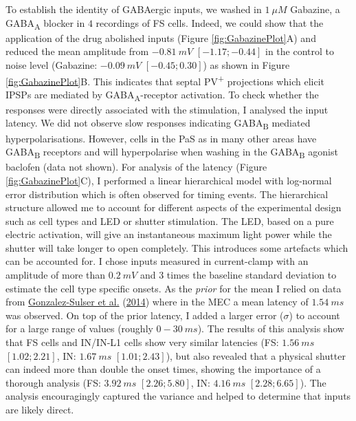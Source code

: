\documentclass[
  12pt,
  a4paper,
  openany]{book}
\begin{document}
\noindent To establish the identity of GABAergic inputs, we washed in \(1\ \mu M\) Gabazine, a GABA\textsubscript{A} blocker in \(4\) recordings of FS cells. Indeed, we could show that the application of the drug abolished inputs (Figure \ref{fig:GabazinePlot}A) and reduced the mean amplitude from \(-0.81\)\(\ mV\) \([-1.17; -0.44]\) in the control to noise level (Gabazine: \(-0.09\ mV\) \([-0.45; 0.30]\)) as shown in Figure \ref{fig:GabazinePlot}B. This indicates that septal PV\textsuperscript{+} projections which elicit IPSPs are mediated by GABA\textsubscript{A}-receptor activation. To check whether the responses were directly associated with the stimulation, I analysed the input latency. We did not observe slow responses indicating GABA\textsubscript{B} mediated hyperpolarisations. However, cells in the PaS as in many other areas have GABA\textsubscript{B} receptors and will hyperpolarise when washing in the GABA\textsubscript{B} agonist baclofen (data not shown). For analysis of the latency (Figure \ref{fig:GabazinePlot}C), I performed a linear hierarchical model with log-normal error distribution which is often observed for timing events. The hierarchical structure allowed me to account for different aspects of the experimental design such as cell types and LED or shutter stimulation. The LED, based on a pure electric activation, will give an instantaneous maximum light power while the shutter will take longer to open completely. This introduces some artefacts which can be accounted for. I chose inputs measured in current-clamp with an amplitude of more than \(0.2\ mV\) and \(3\) times the baseline standard deviation to estimate the cell type specific onsets. As the \emph{prior} for the mean I relied on data from \protect\hyperlink{ref-gonzalez-sulser_gabaergic_2014}{Gonzalez-Sulser et al.} (\protect\hyperlink{ref-gonzalez-sulser_gabaergic_2014}{2014}) where in the MEC a mean latency of \(1.54\ ms\) was observed. On top of the prior latency, I added a larger error (\(\sigma\)) to account for a large range of values (roughly \(0-30\ ms\)). The results of this analysis show that FS cells and IN/IN-L1 cells show very similar latencies (FS: \(1.56\ ms\) \([1.02; 2.21]\), IN: \(1.67\ ms\) \([1.01; 2.43]\)), but also revealed that a physical shutter can indeed more than double the onset times, showing the importance of a thorough analysis (FS: \(3.92\ ms\) \([2.26; 5.80]\), IN: \(4.16\ ms\) \([2.28; 6.65]\)). The analysis encouragingly captured the variance and helped to determine that inputs are likely direct.
\end{document}
